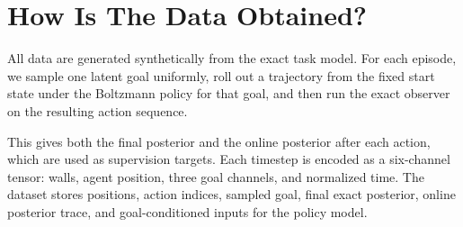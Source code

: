 \documentclass[11pt]{article}
\begin{document}
\section{How Is The Data Obtained?}
All data are generated synthetically from the exact task model. For each
episode, we sample one latent goal uniformly, roll out a trajectory from the
fixed start state under the Boltzmann policy for that goal, and then run the
exact observer on the resulting action sequence.

This gives both the final posterior and the online posterior after each action,
which are used as supervision targets. Each timestep is encoded as a
six-channel tensor: walls, agent position, three goal channels, and normalized
time. The dataset stores positions, action indices, sampled goal, final exact
posterior, online posterior trace, and goal-conditioned inputs for the policy
model.
\end{document}
